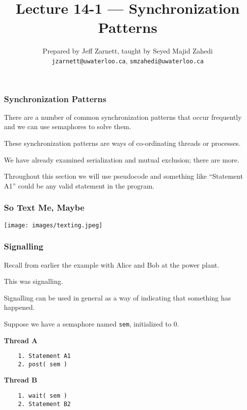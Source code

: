 

\title{Lecture 14-1 --- Synchronization Patterns }

\author{Prepared by Jeff Zarnett, taught by Seyed Majid Zahedi \\ \small \texttt{jzarnett@uwaterloo.ca}, \texttt{smzahedi@uwaterloo.ca}}
\date{}




\begin{frame}
	\titlepage

\end{frame}

\begin{frame}
	\frametitle{Synchronization Patterns}


	There are a number of common synchronization patterns that occur frequently and we can use semaphores to solve them.

	These synchronization patterns are ways of co-ordinating threads or processes.

	We have already examined serialization and mutual exclusion; there are more.

	Throughout this section we will use pseudocode and something like ``Statement A1'' could be any valid statement in the program.

\end{frame}


\begin{frame}
	\frametitle{So Text Me, Maybe}

	\begin{center}
		\texttt{[image: images/texting.jpeg]}
	\end{center}


\end{frame}


\begin{frame}[fragile]
	\frametitle{Signalling}

	Recall from earlier the example with Alice and Bob at the power plant.

	This was signalling.

	Signalling can be used in general as a way of indicating that something has happened.

	Suppose we have a semaphore named \texttt{sem}, initialized to 0.

	\begin{multicols}{2}
		\textbf{Thread A}
		\begin{verbatim}
	1. Statement A1
	2. post( sem )
  		\end{verbatim}
		\columnbreak
		\textbf{Thread B}\vspace{-2em}
		\begin{verbatim}
	1. wait( sem )
	2. Statement B2
  		\end{verbatim}
	\end{multicols}
	\vspace{-2em}


\end{frame}

